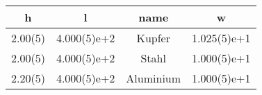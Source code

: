 \begin{tabular}{cccc}
	\toprule
	h & l & name & w \\
	\midrule
	2.00(5) & 4.000(5)e+2 & Kupfer & 1.025(5)e+1 \\
	2.00(5) & 4.000(5)e+2 & Stahl & 1.000(5)e+1 \\
	2.20(5) & 4.000(5)e+2 & Aluminium & 1.000(5)e+1 \\
	\bottomrule
\end{tabular}
